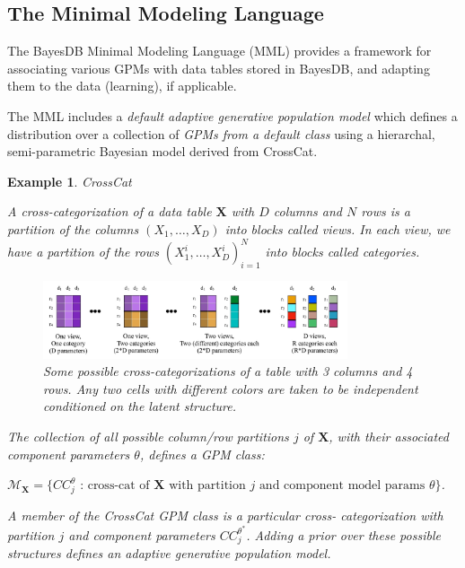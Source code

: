 \documentclass[10pt,letterpaper]{article}
\newtheorem{example}{Example}[section]
\newcommand{\set}[1]{\{#1\}}
\begin{document}
\subsection{The Minimal Modeling Language}
\label{sec:mml}

The BayesDB Minimal Modeling Language (MML) provides a framework for
associating various GPMs with data tables stored in BayesDB, and
adapting them to the data (learning), if applicable.

The MML includes a \textit{default adaptive generative population
  model} which defines a distribution over a collection of
\textit{GPMs from a default class} using a hierarchal, semi-parametric
Bayesian model derived from CrossCat.

\begin{example} \label{ex:crosscat} CrossCat

A cross-categorization of a data table $\mathbf{X}$ with $D$ columns and $N$ 
rows is
a partition of the columns $(X_1,\dots,X_D)$ into blocks called \textit{views}.
In each view, we have a partition of the rows $(X_1^{i},\dots,X_D^{i})_{i=1}^N$
into blocks called \textit{categories}.

\begin{figure}[ht]
    \centering
\includegraphics[width=0.8\textwidth]{cc.jpeg}
\caption{Some possible cross-categorizations of a table with 3 columns
  and 4 rows.  Any two cells with different colors are taken to be
  independent conditioned on the latent structure.}
\label{fig:cc}
\end{figure}
The collection of all possible column/row partitions $j$ of
$\mathbf{X}$, with their associated component parameters $\theta$,
defines a GPM class:

$\mathcal{M}_\textbf{X} = \set{CC_j^{\theta} \text{ : cross-cat of } \mathbf{X}
\text{ with partition } j \text{ and component model params } \theta}$.

A member of the CrossCat GPM class is a particular
cross- categorization with partition $j$ and component parameters
$CC_j^{\theta^*}$.  Adding a prior over these possible structures
defines an adaptive generative population model.
\end{example}
\end{document}
